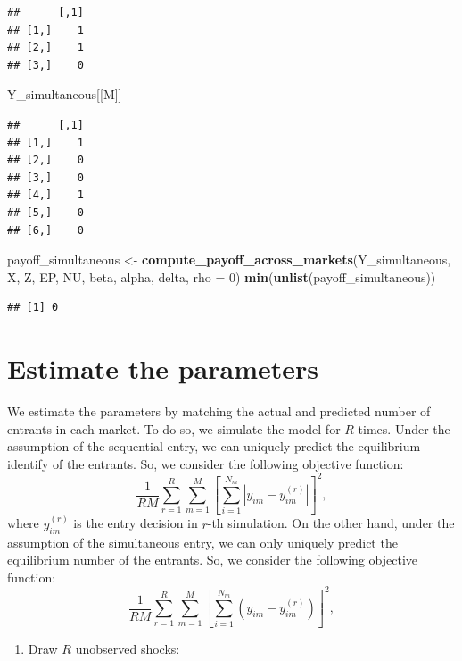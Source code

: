\documentclass[]{book}
\newenvironment{Shaded}{\begin{snugshade}}{\end{snugshade}}
\newcommand{\KeywordTok}[1]{\textcolor[rgb]{0.13,0.29,0.53}{\textbf{#1}}}
\newcommand{\DataTypeTok}[1]{\textcolor[rgb]{0.13,0.29,0.53}{#1}}
\newcommand{\DecValTok}[1]{\textcolor[rgb]{0.00,0.00,0.81}{#1}}
\newcommand{\StringTok}[1]{\textcolor[rgb]{0.31,0.60,0.02}{#1}}
\newcommand{\NormalTok}[1]{#1}
\providecommand{\tightlist}{%
  \setlength{\itemsep}{0pt}\setlength{\parskip}{0pt}}
\begin{document}
\begin{verbatim}
##      [,1]
## [1,]    1
## [2,]    1
## [3,]    0
\end{verbatim}

\begin{Shaded}
\begin{Highlighting}[]
\NormalTok{Y_simultaneous[[M]]}
\end{Highlighting}
\end{Shaded}

\begin{verbatim}
##      [,1]
## [1,]    1
## [2,]    0
## [3,]    0
## [4,]    1
## [5,]    0
## [6,]    0
\end{verbatim}

\begin{Shaded}
\begin{Highlighting}[]
\NormalTok{payoff_simultaneous <-}
\StringTok{  }\KeywordTok{compute_payoff_across_markets}\NormalTok{(Y_simultaneous, X, Z, EP, NU, beta, alpha, delta, }\DataTypeTok{rho =} \DecValTok{0}\NormalTok{)}
\KeywordTok{min}\NormalTok{(}\KeywordTok{unlist}\NormalTok{(payoff_simultaneous))}
\end{Highlighting}
\end{Shaded}

\begin{verbatim}
## [1] 0
\end{verbatim}

\section{Estimate the parameters}\label{estimate-the-parameters-4}

We estimate the parameters by matching the actual and predicted number
of entrants in each market. To do so, we simulate the model for \(R\)
times. Under the assumption of the sequential entry, we can uniquely
predict the equilibrium identify of the entrants. So, we consider the
following objective function: \[
\frac{1}{RM}\sum_{r = 1}^R \sum_{m = 1}^M \left[\sum_{i = 1}^{N_m}|y_{im} - y_{im}^{(r)}| \right]^2,
\] where \(y_{im}^{(r)}\) is the entry decision in \(r\)-th simulation.
On the other hand, under the assumption of the simultaneous entry, we
can only uniquely predict the equilibrium number of the entrants. So, we
consider the following objective function: \[
\frac{1}{RM}\sum_{r = 1}^R \sum_{m = 1}^M \left[\sum_{i = 1}^{N_m}(y_{im} - y_{im}^{(r)}) \right]^2,
\]

\begin{enumerate}
\def\labelenumi{\arabic{enumi}.}
\tightlist
\item
  Draw \(R\) unobserved shocks:
\end{enumerate}
\end{document}
